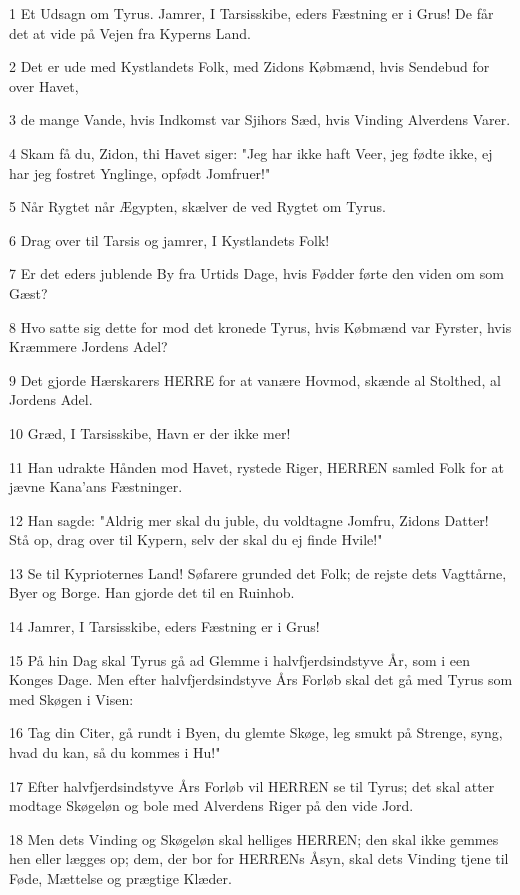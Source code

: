 \par 1 Et Udsagn om Tyrus. Jamrer, I Tarsisskibe, eders Fæstning er i Grus! De får det at vide på Vejen fra Kyperns Land.
\par 2 Det er ude med Kystlandets Folk, med Zidons Købmænd, hvis Sendebud for over Havet,
\par 3 de mange Vande, hvis Indkomst var Sjihors Sæd, hvis Vinding Alverdens Varer.
\par 4 Skam få du, Zidon, thi Havet siger: "Jeg har ikke haft Veer, jeg fødte ikke, ej har jeg fostret Ynglinge, opfødt Jomfruer!"
\par 5 Når Rygtet når Ægypten, skælver de ved Rygtet om Tyrus.
\par 6 Drag over til Tarsis og jamrer, I Kystlandets Folk!
\par 7 Er det eders jublende By fra Urtids Dage, hvis Fødder førte den viden om som Gæst?
\par 8 Hvo satte sig dette for mod det kronede Tyrus, hvis Købmænd var Fyrster, hvis Kræmmere Jordens Adel?
\par 9 Det gjorde Hærskarers HERRE for at vanære Hovmod, skænde al Stolthed, al Jordens Adel.
\par 10 Græd, I Tarsisskibe, Havn er der ikke mer!
\par 11 Han udrakte Hånden mod Havet, rystede Riger, HERREN samled Folk for at jævne Kana'ans Fæstninger.
\par 12 Han sagde: "Aldrig mer skal du juble, du voldtagne Jomfru, Zidons Datter! Stå op, drag over til Kypern, selv der skal du ej finde Hvile!"
\par 13 Se til Kyprioternes Land! Søfarere grunded det Folk; de rejste dets Vagttårne, Byer og Borge. Han gjorde det til en Ruinhob.
\par 14 Jamrer, I Tarsisskibe, eders Fæstning er i Grus!
\par 15 På hin Dag skal Tyrus gå ad Glemme i halvfjerdsindstyve År, som i een Konges Dage. Men efter halvfjerdsindstyve Års Forløb skal det gå med Tyrus som med Skøgen i Visen:
\par 16 Tag din Citer, gå rundt i Byen, du glemte Skøge, leg smukt på Strenge, syng, hvad du kan, så du kommes i Hu!"
\par 17 Efter halvfjerdsindstyve Års Forløb vil HERREN se til Tyrus; det skal atter modtage Skøgeløn og bole med Alverdens Riger på den vide Jord.
\par 18 Men dets Vinding og Skøgeløn skal helliges HERREN; den skal ikke gemmes hen eller lægges op; dem, der bor for HERRENs Åsyn, skal dets Vinding tjene til Føde, Mættelse og prægtige Klæder.


